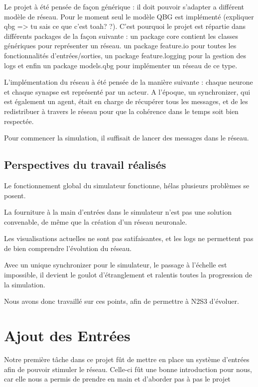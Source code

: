 \documentclass{article}
\begin{document}
Le projet à été pensée de façon générique : il doit pouvoir s’adapter a différent modèle de réseau. Pour le moment seul le modèle QBG est implémenté (expliquer qbg => tu sais ce que c’est toah? ?). C’est pourquoi le projet est répartie dans différents packages de la façon suivante : un package core contient les classes génériques pour représenter un réseau. un package feature.io pour toutes les fonctionnalités d’entrées/sorties, un package feature.logging pour la gestion des logs et enfin un package models.qbg pour implémenter un réseau de ce type.

L’implémentation du réseau à été pensée de la manière suivante : chaque neurone et chaque synapse est représenté par un acteur. A l’époque, un synchronizer, qui est également  un agent, était en charge de récupérer tous les messages, et de les redistribuer à travers le réseau pour que la cohérence dans le temps soit bien respectée. 

Pour commencer la simulation, il suffisait de lancer des messages dans le réseau.


\subsection{Perspectives du travail réalisés}


Le fonctionnement global du simulateur fonctionne, hélas plusieurs problèmes se posent. 

La fourniture à la main d’entrées dans le simulateur n’est pas une solution convenable, de même que la création d’un réseau neuronale.

Les visualisations actuelles ne sont pas satifaisantes, et les logs ne permettent pas de bien comprendre l’évolution du réseau.

Avec un unique synchronizer pour le simulateur, le passage à l’échelle est impossible, il devient le goulot d’étranglement et ralentis toutes la progression de la simulation.

Nous avons donc travaillé sur ces points, afin de permettre à N2S3 d’évoluer.

\newpage

\section{Ajout des Entrées}

    Notre première tâche dans ce projet fût de mettre en place un système d'entrées afin de pouvoir stimuler le réseau. Celle-ci fût une bonne introduction pour nous, car elle nous a permis de prendre en main et d’aborder pas à pas le projet
\end{document}
